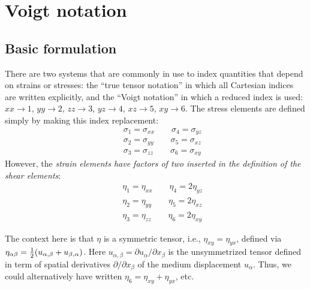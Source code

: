 \documentclass[11pt,fleqn]{article}
\def\bea{\begin{eqnarray}}
\def\eea{\end{eqnarray}}
\def\half{{\textstyle{1\over2}}}
\begin{document}
\section{Voigt notation}
\label{sec:voigt}

\subsection{Basic formulation}

There are two systems that are commonly in use to index quantities
that depend on strains or stresses: the ``true tensor notation'' in which
all Cartesian indices are written explicitly, and the ``Voigt notation''
in which a reduced index is used:
$xx\rightarrow 1$, $yy\rightarrow 2$, $zz\rightarrow 3$,
$yz\rightarrow 4$, $xz\rightarrow 5$, $xy\rightarrow 6$.
The stress elements are defined simply by making this index
replacement:
%
\bea
\label{eq:voigt-sig}
&& \sigma_1=\sigma_{xx} \qquad
   \sigma_4=\sigma_{yz} \nonumber \\
&& \sigma_2=\sigma_{yy} \qquad
   \sigma_5=\sigma_{xz} \\
&& \sigma_3=\sigma_{zz} \qquad
   \sigma_6=\sigma_{xy} \nonumber
\eea
%
However, the {\it strain elements have factors of two inserted in
the definition of the shear elements}:
%
\bea
\label{eq:voigt-eta}
&& \eta_1=\eta_{xx} \qquad
   \eta_4=2\eta_{yz} \nonumber \\
&& \eta_2=\eta_{yy} \qquad
   \eta_5=2\eta_{xz} \\
&& \eta_3=\eta_{zz} \qquad
   \eta_6=2\eta_{xy} \nonumber
\eea

The context here is that $\eta$ is a symmetric
tensor, i.e., $\eta_{xy}=\eta_{yx}$, defined via
$\eta_{\alpha\beta}=\half(u_{\alpha,\beta}+u_{\beta,\alpha})$.
Here $u_{\alpha,\beta}=\partial u_\alpha/\partial x_\beta$ is
the unsymmetrized tensor defined in term of spatial derivatives
$\partial/\partial x_\beta$ of the medium displacement $u_\alpha$.
Thus, we could
alternatively have written $\eta_6=\eta_{xy}+\eta_{yx}$, etc.
\end{document}

